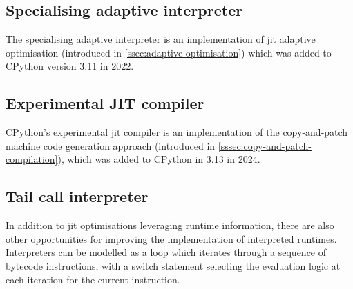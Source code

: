 \subsection{Specialising adaptive interpreter}
\label{ssec:specialising-adaptive-interpreter}


The specialising adaptive interpreter is an implementation of \ac{jit} adaptive optimisation (introduced in \autoref{ssec:adaptive-optimisation}) which was added to CPython version 3.11 in 2022.



\subsection{Experimental JIT compiler}
\label{ssec:experimental-jit-compiler}

CPython's experimental \ac{jit} compiler is an implementation of the copy-and-patch machine code generation approach (introduced in \autoref{sssec:copy-and-patch-compilation}), which was added to CPython in 3.13 in 2024.


\subsection{Tail call interpreter}
\label{ssec:tail-call-interpreter}

In addition to \ac{jit} optimisations leveraging runtime information, there are also other opportunities for improving the implementation of interpreted runtimes.
Interpreters can be modelled as a loop which iterates through a sequence of bytecode instructions, with a switch statement selecting the evaluation logic at each iteration for the current instruction.



